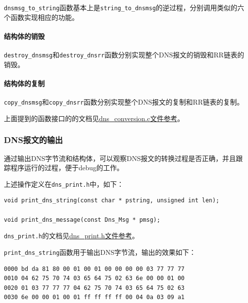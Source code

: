 \documentclass[lang=cn,11pt,a4paper,cite=authornum]{paper}
\begin{document}
\texttt{dnsmsg_to_string}函数基本上是\texttt{string_to_dnsmsg}的逆过程，分别调用类似的六个函数实现相应的功能。

\paragraph{结构体的销毁}

\texttt{destroy_dnsmsg}和\texttt{destroy_dnsrr}函数分别实现整个DNS报文的销毁和RR链表的销毁。

\paragraph{结构体的复制}

\texttt{copy_dnsmsg}和\texttt{copy_dnsrr}函数分别实现整个DNS报文的复制和RR链表的复制。

上面提到的函数接口的的文档见\href{run:./APIdoc/dns__conversion_8c.html}{dns\_conversion.c文件参考}。

\subsubsection{DNS报文的输出}

通过输出DNS字节流和结构体，可以观察DNS报文的转换过程是否正确，并且跟踪程序运行的过程，便于debug的工作。

上述操作定义在\texttt{dns_print.h}中，如下：

\begin{code}
\begin{verbatim}
void print_dns_string(const char * pstring, unsigned int len);
 
void print_dns_message(const Dns_Msg * pmsg);
\end{verbatim}
\end{code}

\texttt{dns_print.h}的文档见\href{run:./APIdoc/dns__print_8h.html}{dns\_print.h文件参考}。

\texttt{print_dns_string}函数用于输出DNS字节流，输出的效果如下：

\begin{code}
\begin{verbatim}
0000 bd da 81 80 00 01 00 01 00 00 00 00 03 77 77 77 
0010 04 62 75 70 74 03 65 64 75 02 63 6e 00 00 01 00 
0020 01 03 77 77 77 04 62 75 70 74 03 65 64 75 02 63 
0030 6e 00 00 01 00 01 ff ff ff ff 00 04 0a 03 09 a1 
\end{verbatim}
\end{code}
\end{document}
